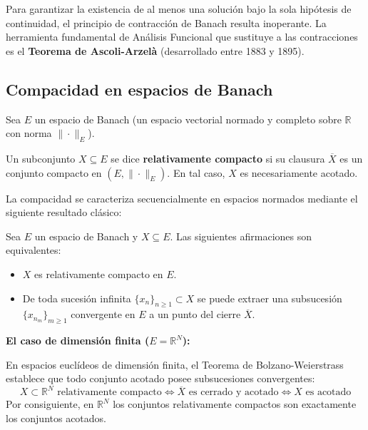 Para garantizar la existencia de al menos una solución bajo la sola hipótesis de continuidad, el principio de contracción de Banach resulta inoperante. La herramienta fundamental de Análisis Funcional que sustituye a las contracciones es el \textbf{Teorema de Ascoli-Arzelà} (desarrollado entre 1883 y 1895).

\subsection{Compacidad en espacios de Banach}

Sea $E$ un espacio de Banach (un espacio vectorial normado y completo sobre $\mathbb{R}$ con norma $\|\cdot\|_E$).

\begin{definición}
    Un subconjunto $X \subseteq E$ se dice \textbf{relativamente compacto} si su clausura $\overline{X}$ es un conjunto compacto en $(E, \|\cdot\|_E)$. En tal caso, $X$ es necesariamente acotado.
\end{definición}

La compacidad se caracteriza secuencialmente en espacios normados mediante el siguiente resultado clásico:

\begin{teorema}
    Sea $E$ un espacio de Banach y $X \subseteq E$. Las siguientes afirmaciones son equivalentes:
    \begin{itemize}
        \item $X$ es relativamente compacto en $E$.
        \item De toda sucesión infinita $\{x_n\}_{n \geq 1} \subset X$ se puede extraer una subsucesión $\{x_{n_m}\}_{m \geq 1}$ convergente en $E$ a un punto del cierre $\overline{X}$.
    \end{itemize}
\end{teorema}

\textbf{El caso de dimensión finita ($E = \mathbb{R}^N$):}

En espacios euclídeos de dimensión finita, el Teorema de Bolzano-Weierstrass establece que todo conjunto acotado posee subsucesiones convergentes:
\[
    X \subset \mathbb{R}^N \text{ relativamente compacto} \iff \overline{X} \text{ es cerrado y acotado} \iff X \text{ es acotado}
\]
Por consiguiente, en $\mathbb{R}^N$ los conjuntos relativamente compactos son exactamente los conjuntos acotados.

\medskip

